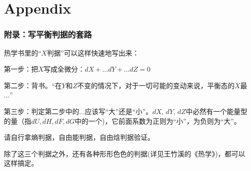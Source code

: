 \documentclass[CJK,13pt]{beamer}
\begin{document}
\section{Appendix}

\begin{frame}
\frametitle{附录：写平衡判据的套路}

热学书里的“$X$判据”可以这样快速地写出来：

\bitem
\item{第一步：把$X$写成全微分：$dX + \ldots dY + \ldots dZ = 0$}
\item{第二步：背书。“在$Y$和$Z$不变的情况下，对于一切可能的变动来说，平衡态的$X$最$\ldots$”}
\item{第三步：判定第二步中的$\ldots$应该写“大”还是“小”。$dX$, $dY$, $dZ$中必然有一个能量型的量（指$dU, dH, dF, dG$中的一个)，它前面系数为正则为“小”，为负则为“大”。}
\eitem

请自行拿熵判据，自由能判据，自由焓判据验证。

除了这三个判据之外，还有各种形形色色的判据(详见王竹溪的《热学》)，都可以这样搞定。
\end{frame}


\ech
\end{document}
